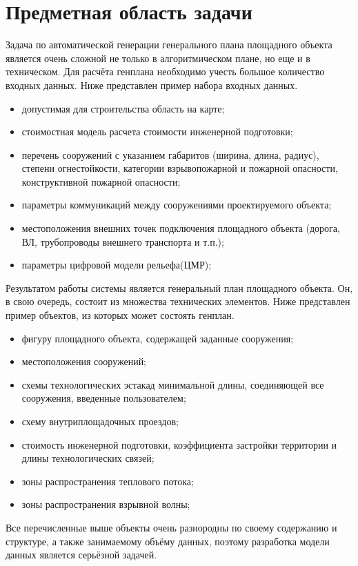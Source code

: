 \section{\Large{Предметная область задачи}}

Задача по автоматической генерации генерального плана площадного объекта является очень сложной не только
в алгоритмическом плане, но еще и в техническом. Для расчёта генплана необходимо учесть большое количество входных
данных.
Ниже представлен пример набора входных данных.
\begin{itemize}
    \item допустимая для строительства область на карте;
    \item стоимостная модель расчета стоимости инженерной подготовки;
    \item перечень сооружений с указанием габаритов (ширина, длина, радиус),
    степени огнестойкости, категории взрывопожарной и пожарной опасности, конструктивной пожарной опасности;
    \item параметры коммуникаций между сооружениями проектируемого объекта;
    \item местоположения внешних точек подключения площадного объекта (дорога, ВЛ, трубопроводы внешнего транспорта и т.п.);
    \item параметры цифровой модели рельефа(ЦМР);
\end{itemize}

Результатом работы системы является генеральный план площадного объекта.
Он, в свою очередь, состоит из множества технических элементов.
Ниже представлен пример объектов, из которых может состоять генплан.
\begin{itemize}
    \item фигуру площадного объекта, содержащей заданные сооружения;
    \item местоположения сооружений;
    \item схемы технологических эстакад минимальной длины, соединяющей все сооружения, введенные пользователем;
    \item схему внутриплощадочных проездов;
    \item стоимость инженерной подготовки, коэффициента застройки территории и длины технологических связей;
    \item зоны распространения теплового потока;
    \item зоны распространения взрывной волны;
\end{itemize}

Все перечисленные выше объекты очень разнородны по своему содержанию и структуре, а также занимаемому объёму данных,
поэтому разработка модели данных является серьёзной задачей.